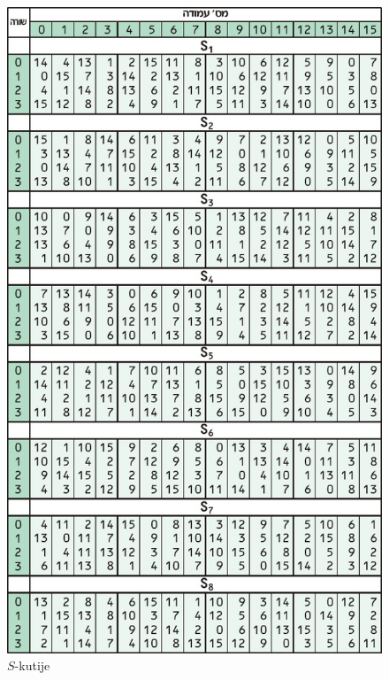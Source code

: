 \documentclass[a4paper,oneside,12pt]{memoir} %
\begin{document}
\begin{spacing}{1.5}
\begin{figure}[h]
\centering \includegraphics[scale=0.52]{S-box.jpg}
\caption{$S$-kutije}
\label{fig:sbox}
\end{figure}
 \newpage

\end{spacing}
\end{document}

